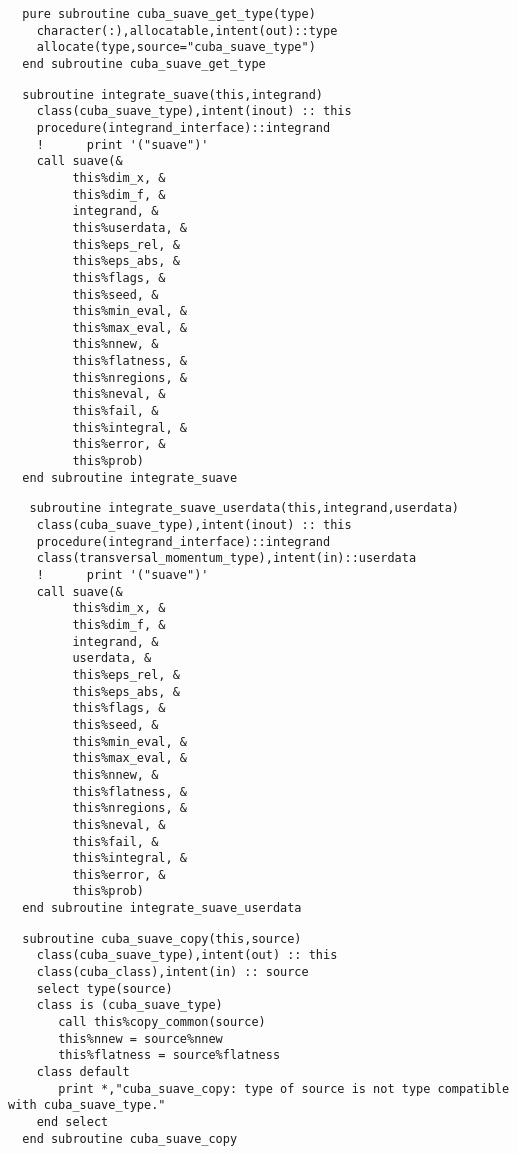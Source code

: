 \begin{Verbatim}
  pure subroutine cuba_suave_get_type(type)
    character(:),allocatable,intent(out)::type
    allocate(type,source="cuba_suave_type")
  end subroutine cuba_suave_get_type
\end{Verbatim}
\begin{Verbatim}
  subroutine integrate_suave(this,integrand)
    class(cuba_suave_type),intent(inout) :: this  
    procedure(integrand_interface)::integrand
    !      print '("suave")'
    call suave(&
         this%dim_x, &
         this%dim_f, &
         integrand, &
         this%userdata, &
         this%eps_rel, &
         this%eps_abs, &
         this%flags, &
         this%seed, &
         this%min_eval, &
         this%max_eval, &
         this%nnew, &
         this%flatness, &
         this%nregions, &
         this%neval, &
         this%fail, &
         this%integral, &
         this%error, &
         this%prob)
  end subroutine integrate_suave
\end{Verbatim}

\begin{Verbatim}
   subroutine integrate_suave_userdata(this,integrand,userdata)
    class(cuba_suave_type),intent(inout) :: this  
    procedure(integrand_interface)::integrand
    class(transversal_momentum_type),intent(in)::userdata
    !      print '("suave")'
    call suave(&
         this%dim_x, &
         this%dim_f, &
         integrand, &
         userdata, &
         this%eps_rel, &
         this%eps_abs, &
         this%flags, &
         this%seed, &
         this%min_eval, &
         this%max_eval, &
         this%nnew, &
         this%flatness, &
         this%nregions, &
         this%neval, &
         this%fail, &
         this%integral, &
         this%error, &
         this%prob)
  end subroutine integrate_suave_userdata
\end{Verbatim}

\begin{Verbatim}
  subroutine cuba_suave_copy(this,source)
    class(cuba_suave_type),intent(out) :: this
    class(cuba_class),intent(in) :: source
    select type(source)
    class is (cuba_suave_type)
       call this%copy_common(source)
       this%nnew = source%nnew
       this%flatness = source%flatness
    class default
       print *,"cuba_suave_copy: type of source is not type compatible with cuba_suave_type."
    end select
  end subroutine cuba_suave_copy
\end{Verbatim}

